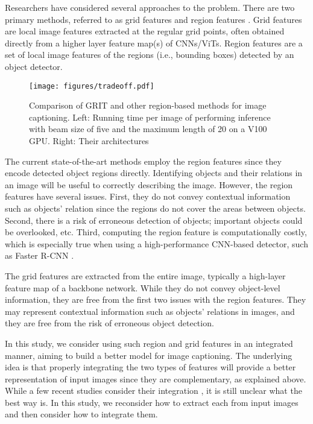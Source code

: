 \documentclass[runningheads]{llncs}
\begin{document}
Researchers have considered several approaches to the problem. There are two primary methods, referred to as grid features \cite{xu2015show,rennie2017self,lu2017knowing}
and region features \cite{anderson2018bottom}. Grid features are local image features extracted at the regular grid points, often obtained directly from a higher layer feature map(s) of CNNs/ViTs. Region features are a set of local image features of the regions (i.e., bounding boxes) detected by an object detector.
\begin{figure}[t]
\begin{center}
\texttt{[image: figures/tradeoff.pdf]}
\end{center}
   \caption{Comparison of GRIT and other region-based methods for image captioning. Left: Running time per image of performing inference with beam size of five and the maximum length of 20 on a V100 GPU. Right: Their architectures
   }
\label{fig:tradeoff}
\end{figure}
The current state-of-the-art methods employ the region features since they encode detected object regions directly. Identifying objects and their relations in an image will be useful to correctly describing the image. However, the region features have several issues. First, they do not convey contextual information such as objects' relation since the regions do not cover the areas between objects. Second, there is a risk of erroneous detection of objects; important objects could be overlooked, etc. Third, computing the region feature is computationally costly, which is especially true when using a high-performance CNN-based detector, such as Faster R-CNN \cite{ren2015faster}. 

The grid features are extracted from the entire image, typically a high-layer feature map of a backbone network. While they do not convey object-level information, they are free from the first two issues with the region features. They may represent contextual information such as objects' relations in images, and they are free from the risk of erroneous object detection. 

In this study, we consider using such region and grid features in an integrated manner, aiming to build a better model for image captioning. The underlying idea is that properly integrating the two types of features will provide a better representation of input images since they are complementary, as explained above. While a few recent studies consider their integration \cite{luo2021dual,xian2022dual}, it is still unclear what the best way is. In this study, we reconsider how to extract each from input images and then consider how to integrate them.
\end{document}

